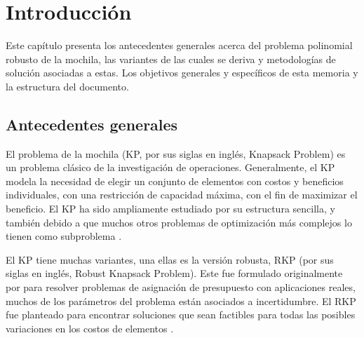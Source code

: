 \documentclass[spanish, a4paper, 12pt, openany,final]{book}
\begin{document}
\newpage
{ 
\listoffigures}


\newpage
{}   %
\setcounter{page}{1}                                    %


\chapter{Introducción}
Este capítulo presenta los antecedentes generales acerca del problema polinomial robusto de la mochila, las variantes de las cuales se deriva y metodologías de solución asociadas a estas. Los objetivos generales y específicos de esta memoria y la estructura del documento.


\section{Antecedentes generales}

El problema de la mochila (KP, por sus siglas en inglés, Knapsack Problem) es un problema clásico de la investigación de operaciones. Generalmente, el KP modela la necesidad de elegir un conjunto de elementos con costos y beneficios individuales, con una restricción de capacidad máxima, con el fin de maximizar el beneficio. El KP ha sido ampliamente estudiado por su estructura sencilla, y también debido a que muchos otros problemas de optimización más complejos lo tienen como subproblema \citep*{martello_knapsack_1990}.

El KP tiene muchas  variantes, una ellas es la versión robusta, RKP (por sus siglas en inglés, Robust Knapsack Problem). Este fue formulado originalmente por \cite{eilon_application_1987} para resolver problemas de asignación de presupuesto con aplicaciones reales, muchos de los parámetros del problema están asociados a incertidumbre. El RKP fue planteado para encontrar soluciones que sean factibles para todas las posibles variaciones en los costos de elementos \citep{monaci_exact_2013}.
\end{document}
